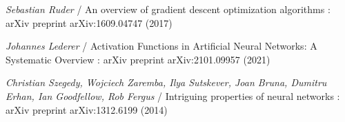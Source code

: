 \documentclass[14pt,a4paper]{extarticle}
\newcounter{e}
\numberwithin{equation}{section}
\numberwithin{figure}{section}
\begin{document}
\begin{thebibliography}{99}
    \textit{Sebastian Ruder} /
    An overview of gradient descent optimization algorithms :
    arXiv preprint arXiv:1609.04747 (2017)

    \textit{Johannes Lederer} /
    Activation Functions in Artificial Neural Networks: A Systematic Overview :
    arXiv preprint arXiv:2101.09957 (2021)

    \textit{Christian Szegedy, Wojciech Zaremba, Ilya Sutskever, Joan Bruna, Dumitru Erhan, Ian Goodfellow, Rob Fergus} /
    Intriguing properties of neural networks :
    arXiv preprint arXiv:1312.6199 (2014)

\end{thebibliography}
\end{document}
